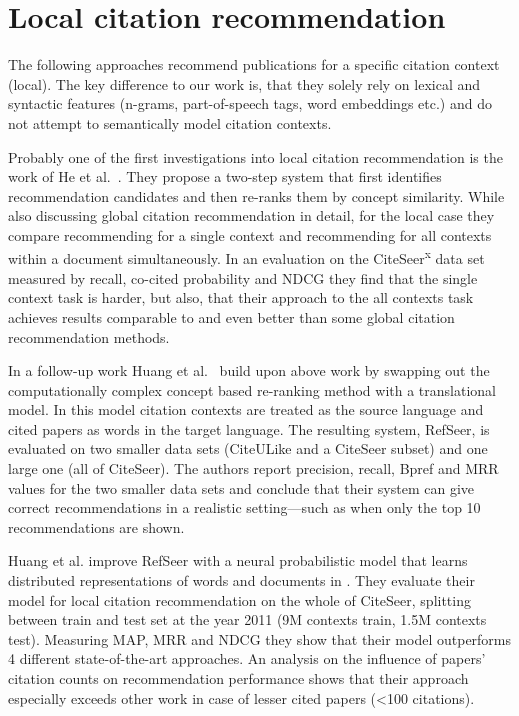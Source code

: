 



\section{Local citation recommendation}\label{sec:localrelated}

The following approaches recommend publications for a specific citation context (local). The key difference to our work is, that they solely rely on lexical and syntactic features (n-grams, part-of-speech tags, word embeddings etc.) and do not attempt to semantically model citation contexts.

Probably one of the first investigations into local citation recommendation is the work of He et al.~\cite{He2010}. They propose a two-step system that first identifies recommendation candidates and then re-ranks them by concept similarity. While also discussing global citation recommendation in detail, for the local case they compare recommending for a single context and recommending for all contexts within a document simultaneously. In an evaluation on the CiteSeer\textsuperscript{x} data set measured by recall, co-cited probability and NDCG they find that the single context task is harder, but also, that their approach to the all contexts task achieves results comparable to and even better than some global citation recommendation methods.

In a follow-up work Huang et al.~\cite{Huang2014} build upon above work by swapping out the computationally complex concept based re-ranking method with a translational model. In this model citation contexts are treated as the source language and cited papers as words in the target language. The resulting system, RefSeer, is evaluated on two smaller data sets (CiteULike and a CiteSeer subset) and one large one (all of CiteSeer). The authors report precision, recall, Bpref and MRR values for the two smaller data sets and conclude that their system can give correct recommendations in a realistic setting---such as when only the top 10 recommendations are shown.

Huang et al. improve RefSeer with a neural probabilistic model that learns distributed representations of words and documents in \cite{Huang2015}. They evaluate their model for local citation recommendation on the whole of CiteSeer, splitting between train and test set at the year 2011 (9M contexts train, 1.5M contexts test). Measuring MAP, MRR and NDCG they show that their model outperforms 4 different state-of-the-art approaches. An analysis on the influence of papers' citation counts on recommendation performance shows that their approach especially exceeds other work in case of lesser cited papers (<100 citations).


